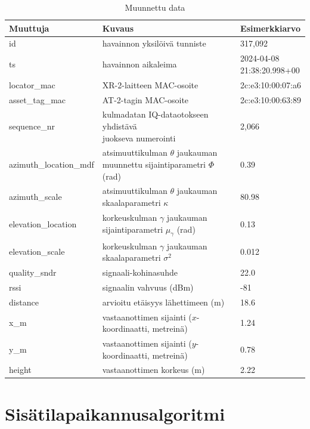 \documentclass[
  12pt,
  a4paper, twoside]{book}
\begin{document}
\def\arraystretch{1.25} 
\begin{table}[H]
\centering
\begin{tabular}{|l|l|l|}
\hline
Muuttuja & Kuvaus & Esimerkkiarvo\\
\hline
id & havainnon yksilöivä tunniste & 317,092 \\
ts & havainnon aikaleima & \makecell[l]{2024-04-08 \\ 21:38:20.998+00}\\
locator\_mac & XR-2-laitteen MAC-osoite & 2c:e3:10:00:07:a6
\\
asset\_tag\_mac & AT-2-tagin MAC-osoite & 2c:e3:10:00:63:89\\
sequence\_nr & \makecell[l]{kulmadatan IQ-dataotokseen yhdistävä \\ juokseva numerointi} & 2,066\\
azimuth\_location\_mdf & \makecell[l]{atsimuuttikulman $\theta$ \\ jaukauman muunnettu sijaintiparametri \\ $\Phi$ (rad)} & 0.39
\\
azimuth\_scale & \makecell[l]{atsimuuttikulman $\theta$ \\ jaukauman skaalaparametri $\kappa$} & 80.98
\\
elevation\_location & \makecell[l]{korkeuskulman $\gamma$ \\ jaukauman sijaintiparametri $\mu_{\gamma}$ (rad)} & 0.13
\\
elevation\_scale & \makecell[l]{korkeuskulman $\gamma$ \\ jaukauman skaalaparametri $\sigma^2$} & 0.012
\\
quality\_sndr & signaali-kohinasuhde & 22.0 \\
rssi & signaalin vahvuus (dBm) & -81\\
distance & arvioitu etäisyys lähettimeen (m) & 18.6\\
x\_m & \makecell[l]{vastaanottimen sijainti \\ ($x$-koordinaatti, metreinä)} & 1.24\\
y\_m & \makecell[l]{vastaanottimen sijainti \\ ($y$-koordinaatti, metreinä)} & 0.78\\
height & vastaanottimen korkeus (m) & 2.22 \\
\hline
\end{tabular}
\caption{Muunnettu data}
\label{tab:muunnettu-data}
\end{table}

\section{Sisätilapaikannusalgoritmi}
\end{document}
